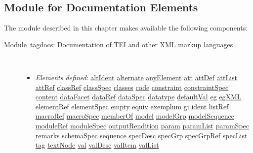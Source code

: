 \subsection[{Module for Documentation Elements}]{Module for Documentation Elements}\label{TDformal}\par
The module described in this chapter makes available the following components: \begin{description}

\item[{Module tagdocs: Documentation of TEI and other XML markup languages}]\hspace{1em}\hfill\linebreak
\mbox{}\\[-10pt] \begin{itemize}
\item {\itshape Elements defined}: \hyperref[TEI.altIdent]{altIdent} \hyperref[TEI.alternate]{alternate} \hyperref[TEI.anyElement]{anyElement} \hyperref[TEI.att]{att} \hyperref[TEI.attDef]{attDef} \hyperref[TEI.attList]{attList} \hyperref[TEI.attRef]{attRef} \hyperref[TEI.classRef]{classRef} \hyperref[TEI.classSpec]{classSpec} \hyperref[TEI.classes]{classes} \hyperref[TEI.code]{code} \hyperref[TEI.constraint]{constraint} \hyperref[TEI.constraintSpec]{constraintSpec} \hyperref[TEI.content]{content} \hyperref[TEI.dataFacet]{dataFacet} \hyperref[TEI.dataRef]{dataRef} \hyperref[TEI.dataSpec]{dataSpec} \hyperref[TEI.datatype]{datatype} \hyperref[TEI.defaultVal]{defaultVal} \hyperref[TEI.eg]{eg} \hyperref[TEI.egXML]{egXML} \hyperref[TEI.elementRef]{elementRef} \hyperref[TEI.elementSpec]{elementSpec} \hyperref[TEI.empty]{empty} \hyperref[TEI.equiv]{equiv} \hyperref[TEI.exemplum]{exemplum} \hyperref[TEI.gi]{gi} \hyperref[TEI.ident]{ident} \hyperref[TEI.listRef]{listRef} \hyperref[TEI.macroRef]{macroRef} \hyperref[TEI.macroSpec]{macroSpec} \hyperref[TEI.memberOf]{memberOf} \hyperref[TEI.model]{model} \hyperref[TEI.modelGrp]{modelGrp} \hyperref[TEI.modelSequence]{modelSequence} \hyperref[TEI.moduleRef]{moduleRef} \hyperref[TEI.moduleSpec]{moduleSpec} \hyperref[TEI.outputRendition]{outputRendition} \hyperref[TEI.param]{param} \hyperref[TEI.paramList]{paramList} \hyperref[TEI.paramSpec]{paramSpec} \hyperref[TEI.remarks]{remarks} \hyperref[TEI.schemaSpec]{schemaSpec} \hyperref[TEI.sequence]{sequence} \hyperref[TEI.specDesc]{specDesc} \hyperref[TEI.specGrp]{specGrp} \hyperref[TEI.specGrpRef]{specGrpRef} \hyperref[TEI.specList]{specList} \hyperref[TEI.tag]{tag} \hyperref[TEI.textNode]{textNode} \hyperref[TEI.val]{val} \hyperref[TEI.valDesc]{valDesc} \hyperref[TEI.valItem]{valItem} \hyperref[TEI.valList]{valList}

\end{itemize}
\end{description}
